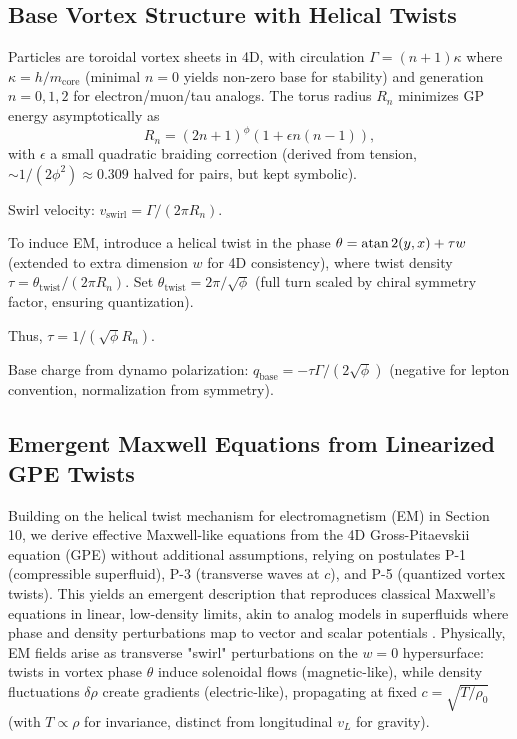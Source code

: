 \documentclass{article}
\begin{document}
\subsection{Base Vortex Structure with Helical Twists}

Particles are toroidal vortex sheets in 4D, with circulation $\Gamma = (n + 1) \kappa$ where $\kappa = h / m_{\text{core}}$ (minimal $n=0$ yields non-zero base for stability) and generation $n=0,1,2$ for electron/muon/tau analogs. The torus radius $R_n$ minimizes GP energy asymptotically as
\[
R_n = (2n + 1)^\phi \left(1 + \epsilon n (n-1)\right),
\]
with $\epsilon$ a small quadratic braiding correction (derived from tension, $\sim 1/(2\phi^2) \approx 0.309$ halved for pairs, but kept symbolic).

Swirl velocity: $v_{\text{swirl}} = \Gamma / (2\pi R_n)$.

To induce EM, introduce a helical twist in the phase $\theta = \atan2(y,x) + \tau w$ (extended to extra dimension $w$ for 4D consistency), where twist density $\tau = \theta_{\text{twist}} / (2\pi R_n)$. Set $\theta_{\text{twist}} = 2\pi / \sqrt{\phi}$ (full turn scaled by chiral symmetry factor, ensuring quantization).

Thus, $\tau = 1 / (\sqrt{\phi} R_n)$.

Base charge from dynamo polarization: $q_{\text{base}} = - \tau \Gamma / (2 \sqrt{\phi})$ (negative for lepton convention, normalization from symmetry).

\subsection{Emergent Maxwell Equations from Linearized GPE Twists}

Building on the helical twist mechanism for electromagnetism (EM) in Section 10, we derive effective Maxwell-like equations from the 4D Gross-Pitaevskii equation (GPE) without additional assumptions, relying on postulates P-1 (compressible superfluid), P-3 (transverse waves at \(c\)), and P-5 (quantized vortex twists). This yields an emergent description that reproduces classical Maxwell's equations in linear, low-density limits, akin to analog models in superfluids where phase and density perturbations map to vector and scalar potentials \cite{unruh1981experimental, visser1998acoustic}. Physically, EM fields arise as transverse "swirl" perturbations on the \(w=0\) hypersurface: twists in vortex phase \(\theta\) induce solenoidal flows (magnetic-like), while density fluctuations \(\delta \rho\) create gradients (electric-like), propagating at fixed \(c = \sqrt{T / \rho_0}\) (with \(T \propto \rho\) for invariance, distinct from longitudinal \(v_L\) for gravity).
\end{document}
